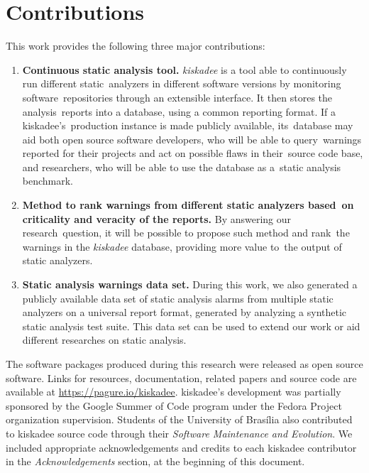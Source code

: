 \section{Contributions}
\label{sec:contributions}

This work provides the following three major contributions:

\begin{enumerate}[label=C\arabic*]
  \item \textbf{Continuous static analysis tool.}
    \textit{kiskadee} is a tool able to continuously run different static\
    analyzers in different software versions by monitoring software\
    repositories through an extensible interface. It then stores the analysis\
    reports into a database, using a common reporting format. If a kiskadee's\
    production instance is made publicly available, its\
    database may aid both open source software developers, who will be able to query\
    warnings reported for their projects and act on possible flaws in their\
    source code base, and researchers, who will be able to use the database as a\
    static analysis benchmark.

  \item \textbf{Method to rank warnings from different static analyzers based\
    on criticality and veracity of the reports.} By answering our research\
    question, it will be possible to propose such method and rank\
    the warnings in the \textit{kiskadee} database, providing more value to\
    the output of static analyzers.

  \item \textbf{Static analysis warnings data set.} During this work, we also
    generated a publicly available data set of static analysis alarms from
    multiple static analyzers on a universal report format, generated by
    analyzing a synthetic static analysis test suite. This data set can be used
    to extend our work or aid different researches on static analysis.

\end{enumerate}

The software packages produced during this research were released as open
source software. Links for resources, documentation, related papers and source
code are available at \url{https://pagure.io/kiskadee}. kiskadee's development
was partially sponsored by the Google Summer of Code program under the Fedora
Project organization supervision. Students of the University of Brasília also
contributed to kiskadee source code through their \textit{Software Maintenance
and Evolution}. We included appropriate acknowledgements and credits to each
kiskadee contributor in the \emph{Acknowledgements} section, at the beginning of
this document.

